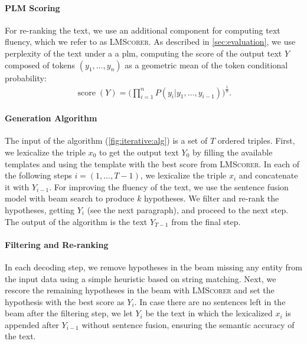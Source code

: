 \paragraph{PLM Scoring} For re-ranking the text, we use an additional component for computing text fluency, which we refer to as \textsc{LMScorer}.
As described in \autoref{sec:evaluation}, we use perplexity of the text under a a \ac{plm}, computing the score of the output text $Y$ composed of tokens $(y_1, \ldots, y_n)$ as a geometric mean of the token conditional probability:
\begin{align}
    \operatorname{score}(Y) = \Bigg( \prod_{i=1}^{n}{P(y_i|y_1, \ldots, y_{i-1})} \Bigg)^{\frac{1}{n}}.
\end{align}




\paragraph{Generation Algorithm}
The input of the algorithm (\autoref{fig:iterative:alg}) is a set of $T$ ordered triples. First, we lexicalize the triple $x_0$ to get the output text $Y_0$ by filling the available templates and using the template with the best score from \textsc{LMScorer}.
In each of the following steps $i=(1, \ldots, T-1)$, we lexicalize the triple $x_i$ and concatenate it with $Y_{i-1}$.  For improving the fluency of the text, we use the sentence fusion model with beam search to produce $k$ hypotheses. We filter and re-rank the hypotheses, getting $Y_{i}$ (see the next paragraph), and proceed to the next step. The output of the algorithm is the text $Y_{T-1}$ from the final step.


\paragraph{Filtering and Re-ranking} In each decoding step, we remove hypotheses in the beam missing any entity from the input data using a simple heuristic based on string matching. Next, we rescore the remaining hypotheses in the beam with \textsc{LMScorer} and set the hypothesis with the best score as $Y_{i}$. In case there are no sentences left in the beam after the filtering step, we let $Y_{i}$ be the text in which the lexicalized $x_i$ is appended after $Y_{i-1}$ without sentence fusion, ensuring the semantic accuracy of the text.



